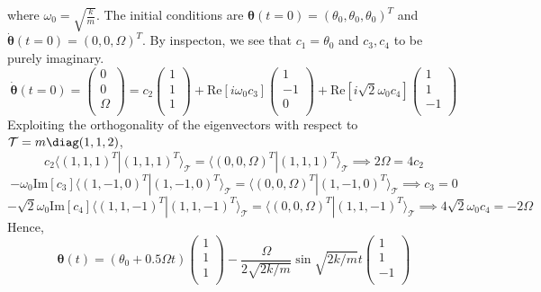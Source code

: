 \documentclass[a4paper]{article}
\begin{document}
\begin{ans}
\begin{enumerate}[label=(\alph*)]
where $\omega_0=\sqrt{\frac{k}{m}}$. The initial conditions are $\boldsymbol{\theta}(t=0)=(\theta_0,\theta_0,\theta_0)^T$ and $\boldsymbol{\dot{\theta}}(t=0)=(0,0,\Omega)^T$. By inspecton, we see that $c_1=\theta_0$ and $c_3,c_4$ to be purely imaginary.
$$\boldsymbol{\dot{\theta}}(t=0)=\begin{pmatrix}0\\0\\\Omega\\\end{pmatrix}=c_2\begin{pmatrix}1\\1\\1\\\end{pmatrix}+\text{Re}[i\omega_0c_3]\begin{pmatrix}1\\-1\\0\\\end{pmatrix}+\text{Re}[i\sqrt{2}\omega_0c_4]\begin{pmatrix}1\\1\\-1\\\end{pmatrix}$$
Exploiting the orthogonality of the eigenvectors with respect to $\mathcal{T}=m\diag(1,1,2)$,
$$c_2\langle(1,1,1)^T|(1,1,1)^T\rangle_{\mathcal{T}}=\langle(0,0,\Omega)^T|(1,1,1)^T\rangle_{\mathcal{T}}\implies 2\Omega=4c_2$$
$$-\omega_0\text{Im}[c_3]\langle(1,-1,0)^T|(1,-1,0)^T\rangle_{\mathcal{T}}=\langle(0,0,\Omega)^T|(1,-1,0)^T\rangle_{\mathcal{T}}\implies c_3=0$$
$$-\sqrt{2}\omega_0\text{Im}[c_4]\langle(1,1,-1)^T|(1,1,-1)^T\rangle_{\mathcal{T}}=\langle(0,0,\Omega)^T|(1,1,-1)^T\rangle_{\mathcal{T}}\implies 4\sqrt{2}\omega_0c_4=-2\Omega$$
Hence,
$$\boldsymbol{\theta}(t)=(\theta_0+0.5\Omega t)\begin{pmatrix}1\\1\\1\\\end{pmatrix}-\frac{\Omega}{2\sqrt{2k/m}}\sin\sqrt{2k/m}t\begin{pmatrix}1\\1\\-1\\\end{pmatrix}$$
\end{enumerate}
\end{ans}
\newpage
\end{document}
